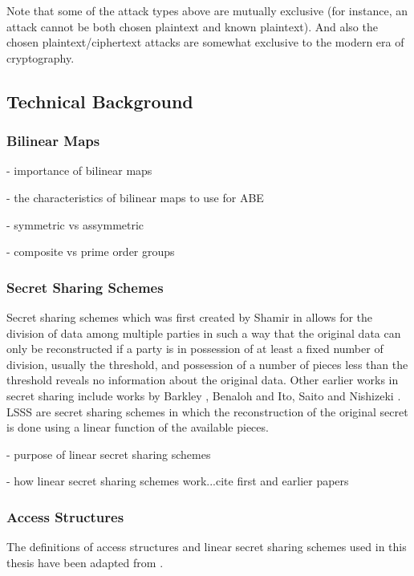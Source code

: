 Note that some of the attack types above are mutually exclusive (for instance, an attack cannot be both chosen plaintext and known plaintext). And also the chosen plaintext/ciphertext attacks are somewhat exclusive to the modern era of cryptography.


\subsection{Technical Background}

\subsubsection*{Bilinear Maps}

- importance of bilinear maps

- the characteristics of bilinear maps to use for ABE

- symmetric vs assymmetric

- composite vs prime order groups

\subsubsection*{Secret Sharing Schemes}

Secret sharing schemes which was first created by Shamir in \cite{Shamir1979} allows for the division of data among multiple parties in such a way that the original data can only be reconstructed if a party is in possession of at least a fixed number of division, usually the threshold, and possession of a number of pieces less than the threshold reveals no information about the original data. Other earlier works in secret sharing include works by Barkley \cite{Blakley1979}, Benaloh \cite{Benaloh1988} and Ito, Saito and Nishizeki \cite{Ito1989}. LSSS are secret sharing schemes in which the reconstruction of the original secret is done using a linear function of the available pieces\cite{Beimel1996}.

- purpose of linear secret sharing schemes

- how linear secret sharing schemes work...cite first and earlier papers


\subsubsection{Access Structures}

The definitions of access structures and linear secret sharing schemes used in this thesis have been adapted from \cite{Beimel1996}.


